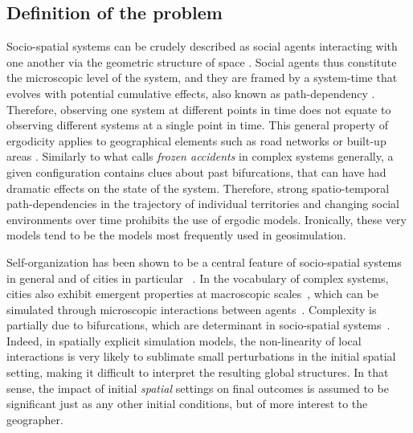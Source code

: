 \documentclass{JASSS}
\begin{document}
\subsection{Definition of the problem}
Socio-spatial systems can be crudely described as social agents interacting with one another via the geometric structure of space . Social agents thus constitute the microscopic level of the system, and they are framed by a system-time that evolves with potential cumulative effects, also known as path-dependency \citep{arthur1994increasing}. Therefore, observing one system at different points in time does not equate to observing different systems at a single point in time. This general property of ergodicity applies to geographical elements such as road networks or built-up areas \citep{pumain2003approche}. Similarly to what \citet{gell1995quark} calls \emph{frozen accidents} in complex systems generally, a given configuration contains clues about past bifurcations, that can have had dramatic effects on the state of the system. Therefore, strong spatio-temporal path-dependencies in the trajectory of individual territories and changing social environments over time prohibits the use of ergodic models. Ironically, these very models tend to be the models most frequently used in geosimulation.


Self-organization has been shown to be a central feature of socio-spatial systems in general and of cities in particular ~\citep{AllenSanglier1981,saint1989villes, Portugali2000}. In the vocabulary of complex systems, cities also exhibit emergent properties at macroscopic scales~\citep{pumain2006hierarchy, AzizAlaouiBertelle2009}, which can be simulated through microscopic interactions between agents~\citep{Wu2002, batty2007cities}. Complexity is partially due to bifurcations, which are determinant in socio-spatial systems~\citep{Wilson1981, Wilson2002}. Indeed, in spatially explicit simulation models, the non-linearity of local interactions is very likely to sublimate small perturbations in the initial spatial setting, making it difficult to interpret the resulting global structures. In that sense, the impact of initial \emph{spatial} settings on final outcomes is assumed to be significant just as any other initial conditions, but of more interest to the geographer. \\
\end{document}
